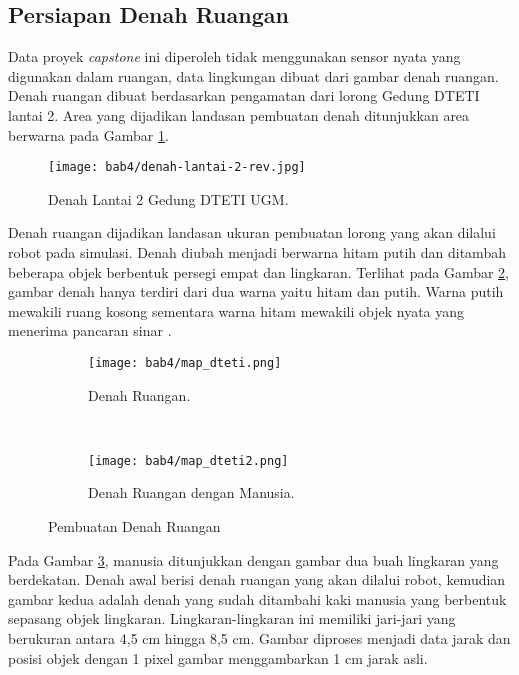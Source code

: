 \subsection{Persiapan Denah Ruangan}
\label{sec:Persiapan}

Data proyek \textit{capstone} ini diperoleh tidak menggunakan sensor nyata yang digunakan dalam ruangan, data lingkungan dibuat dari gambar denah ruangan. Denah ruangan dibuat berdasarkan pengamatan dari lorong Gedung DTETI lantai 2. Area yang dijadikan landasan pembuatan denah ditunjukkan area berwarna pada Gambar \ref*{fig:Ch04_lantai_dteti}. 
\begin{figure}[H]
    \centering
    \texttt{[image: bab4/denah-lantai-2-rev.jpg]}
    \caption{Denah Lantai 2 Gedung DTETI UGM\cite{d00}.}
    \label{fig:Ch04_lantai_dteti}
\end{figure}

Denah ruangan dijadikan landasan ukuran pembuatan lorong yang akan dilalui robot pada simulasi. Denah diubah menjadi berwarna hitam putih dan ditambah beberapa objek berbentuk persegi empat dan lingkaran.
Terlihat pada Gambar \ref{Fig:Ch04_map1}, gambar denah hanya terdiri dari dua warna yaitu hitam dan putih. Warna putih mewakili ruang kosong sementara warna hitam mewakili objek nyata yang menerima pancaran sinar \lidar.

\begin{figure}[H]
    \centering
    \begin{subfigure}[b]{\textwidth}\centering\texttt{[image: bab4/map\_dteti.png]}\caption{Denah Ruangan.}\label{Fig:Ch04_map1}\end{subfigure}\\
    \begin{subfigure}[b]{\textwidth}\centering\texttt{[image: bab4/map\_dteti2.png]}\caption{Denah Ruangan dengan Manusia.}\label{Fig:Ch04_map2}\end{subfigure}
    \caption{Pembuatan Denah Ruangan}
    \label{fig:Ch04_denahruang}
\end{figure}

Pada Gambar \ref{Fig:Ch04_map2}, manusia ditunjukkan dengan gambar dua buah lingkaran yang berdekatan. Denah awal berisi denah ruangan yang akan dilalui robot, kemudian gambar kedua adalah denah yang sudah ditambahi kaki manusia yang berbentuk sepasang objek lingkaran. Lingkaran-lingkaran ini memiliki jari-jari yang berukuran antara 4,5 cm hingga 8,5 cm. Gambar diproses menjadi data jarak dan posisi objek dengan 1 pixel gambar menggambarkan 1 cm jarak asli.

